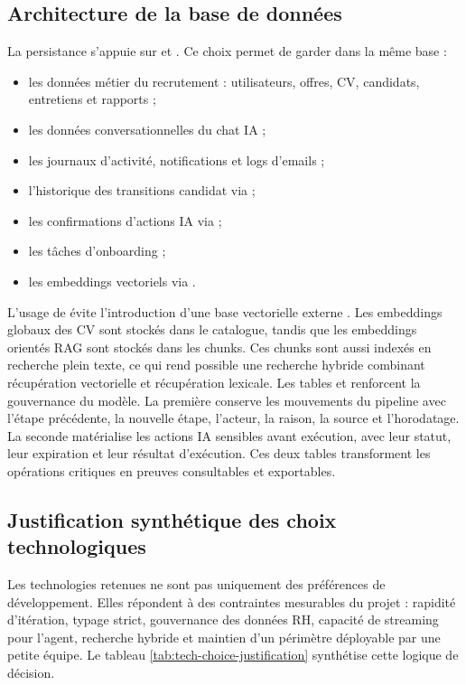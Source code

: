 \subsection{Architecture de la base de données}
La persistance s'appuie sur  et  . Ce choix permet de garder dans la même base :
\begin{itemize}
  \item les données métier du recrutement : utilisateurs, offres, CV, candidats, entretiens et rapports ;
  \item les données conversationnelles du chat IA ;
  \item les journaux d'activité, notifications et logs d'emails ;
  \item l'historique des transitions candidat via  ;
  \item les confirmations d'actions IA via  ;
  \item les tâches d'onboarding ;
  \item les embeddings vectoriels via .
\end{itemize}

L'usage de  évite l'introduction d'une base vectorielle externe . Les embeddings globaux des CV sont stockés dans le catalogue, tandis que les embeddings orientés RAG sont stockés dans les chunks. Ces chunks sont aussi indexés en recherche plein texte, ce qui rend possible une recherche hybride combinant récupération vectorielle et récupération lexicale.
Les tables  et  renforcent la gouvernance du modèle. La première conserve les mouvements du pipeline avec l'étape précédente, la nouvelle étape, l'acteur, la raison, la source et l'horodatage. La seconde matérialise les actions IA sensibles avant exécution, avec leur statut, leur expiration et leur résultat d'exécution. Ces deux tables transforment les opérations critiques en preuves consultables et exportables.

\subsection{Justification synthétique des choix technologiques}
Les technologies retenues ne sont pas uniquement des préférences de développement. Elles répondent à des contraintes mesurables du projet : rapidité d'itération, typage strict, gouvernance des données RH, capacité de streaming pour l'agent, recherche hybride et maintien d'un périmètre déployable par une petite équipe. Le tableau \ref{tab:tech-choice-justification} synthétise cette logique de décision.


